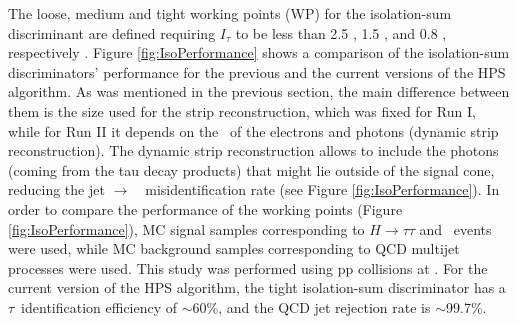 \noindent The loose, medium and tight working points (WP) for the 
isolation-sum discriminant are defined requiring $I_{\tau}$ to be 
less than 2.5 \GeV, 1.5 \GeV, and 0.8 \GeV, 
respectively \cite{CMS-PAS-TAU-16-002}. Figure \ref{fig:IsoPerformance} shows 
a comparison of the isolation-sum discriminators' performance for 
the previous and the current versions of the HPS algorithm. As was 
mentioned in the previous section, the main difference between them is
the size used for the strip reconstruction, which was fixed for 
Run I, while for Run II it depends on the \pt~of the electrons and photons
(dynamic strip reconstruction). The dynamic strip reconstruction
allows to include the photons (coming from the tau decay products)
that might lie outside of the signal cone, reducing the 
jet $\rightarrow$~\tauh~misidentification rate (see Figure \ref{fig:IsoPerformance}). In order to
compare the performance of the working points (Figure \ref{fig:IsoPerformance}), MC signal 
samples corresponding to $H \rightarrow \tau\tau$ and \Zprimetotautau~events were used, while 
MC background samples corresponding to QCD multijet processes were used. This study 
was performed using pp collisions at  \TeV. For the current version of the HPS algorithm,
the tight isolation-sum discriminator has a $\tau$~identification efficiency 
of $\sim$60$\%$, and the QCD jet rejection rate is  $\sim$99.7$\%$.\\

